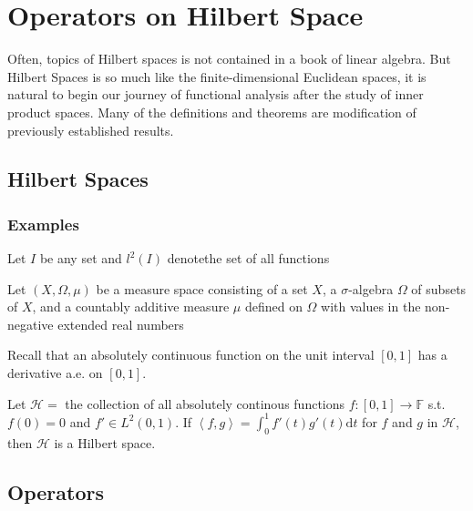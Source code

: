 
\chapter{Operators on Hilbert Space}
Often, topics of Hilbert spaces is not contained in a book of linear algebra. But Hilbert Spaces is so much like the finite-dimensional Euclidean spaces, it is natural to begin our journey of functional analysis after the study of inner product spaces. Many of the definitions and theorems are modification of previously established results. 
\section{Hilbert Spaces}
\subsection{Examples}
\begin{example}
    Let $I$ be any set and $l^2(I)$ denotethe set of all functions 
\end{example}

\begin{example}
    Let $(X,\Omega,\mu)$ be a measure space consisting of a set $X$, a $\sigma$-algebra $\Omega$ of subsets of $X$,
    and a countably additive measure $\mu$ defined on $\Omega$ with values in the non-negative extended real numbers
\end{example}

Recall that an absolutely continuous function on the unit interval $[0,1]$ has a derivative a.e. on $[0,1]$.
\begin{example}
    Let $\mathcal{H}=$ the collection of all absolutely continous functions $f:[0,1]\to \mathbb{F}$ s.t. $f(0)=0$
    and $f'\in L^2(0,1)$. If $\left\langle f,g\right\rangle=\int_0^1 f'(t)g'(t)\mathrm{d}t$ for $f$ and $g$ in $\mathcal{H}$,
    then $\mathcal{H}$ is a Hilbert space.
\end{example}

\section{Operators}

